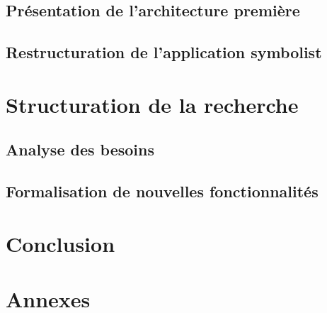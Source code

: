 \documentclass[utf8,final]{stageM2R} %
\begin{document}
	\section{Présentation de l'architecture première}
	\label{sec:architecturePremiere}
	

	\section{Restructuration de l'application symbolist}
	\label{sec:restructurationSymbolist}
	
	
\chapter{Structuration de la recherche}
\label{chap:structurationRecherche}

	\section{Analyse des besoins}
	\label{sec:analyseBesoins}
	
	
	\section{Formalisation de nouvelles fonctionnalités}
	\label{sec:formalisationNouvellesFonc}
	
	
\clearpage
\chapter{Conclusion}


\printbibliography

\listoffigures

\printglossary

\appendix
\chapter{Annexes}

\end{document}
